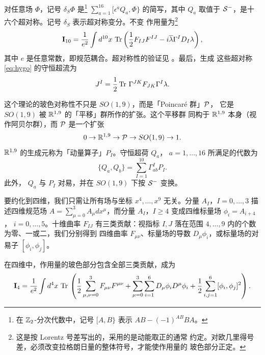  对任意场 $\Phi$，记号 $\delta_S \Phi$ 是\footnote{在
$\Bbb{Z}_2$-分次代数中，记号 $[A,B\}$ 表示 $AB-(-1)^{AB}BA$。}
$\sum_{a=1}^{16}[\epsilon^aQ_a,\Phi\}$ 的简写，其中 $Q_a$ 取值于
${\EUS}^-$，是十六个超对称。记号 $\delta_S$ 表示超对称变分。不变
作用量为\footnote{这是按 Lorentz 号差写出的，采用的是动能取正的通常
约定。对欧几里得号差，必须改变拉格朗日量的整体符号，才能使作用量的
玻色部分正定。} %
\setcounter{equation}{5}
\begin{equation}\label{eq:ygo}
{{\cmmib I}}_{10}={1\over e^2}\int
d^{10}x\,\Tr\left({1\over
2}F_{IJ}F^{IJ}-i\bar\lambda\Gamma^ID_I\lambda\right),
\end{equation}
 其中
$e$ 是任意常数，即规范耦合。超对称性的验证见 \cite{ref42}。最后，生成
这些超对称 \eqref{eq:hygo} 的守恒超流为
\setcounter{equation}{6}
\begin{equation}\label{eq:bygo}
J^I=\half\Tr\, \Gamma^{JK}F_{JK}\Gamma^I\lambda.
\end{equation}

 这个理论的玻色对称性不只是 $SO(1,9)$，而是「Poincaré 群」$\EUP$，
它是 $SO(1,9)$ 被 $\Bbb{R}^{1,9}$ 的「平移」群所作的扩张。这个平移群
同构于 $\Bbb{R}^{1,9}$ 本身（视作阿贝尔群），而 ${\EUP}$ 是一个扩张 %
\setcounter{equation}{7}
\begin{equation}\label{eq:ugy}
0\to
\Bbb{R}^{1,9}\to \EUP\to SO(1,9)\to 1.
\end{equation}
  $\Bbb{R}^{1,9}$ 的生成元称为「动量算子」$P_I$。守恒超荷 $Q_a$，
$a=1,\dots,16$ 所满足的代数为 %
\setcounter{equation}{8}
\begin{equation}\label{eq:realify}
\{Q_a,Q_b\}=\sum_{I=1}^{10}\Gamma^I_{ab}P_I.
\end{equation}
 此外，
$Q_a$ 与 $P_I$ 对易，并在 $SO(1,9)$ 下按 ${\EUS}^-$ 变换。

\par{}

 要约化到四维，我们只需让所有场与坐标 $x^4,\dots,x^9$ 无关。分量
$A_I$，$I=0,\dots,3$ 描述四维规范场
$A=\sum_{\mu=0}^3A_\mu dx^\mu$，而分量 $A_I$，$I\ge
4$ 变成四维标量场 $\phi_i=A_{i+4}$，
$i=0,\dots,5$。十维曲率 $F_{IJ}$ 有三类贡献：视指标
$I,J$ 落在范围 $4,\dots, 9$ 内的个数为零、一或二，我们分别得到
四维曲率 $F_{\mu\nu}$、标量场的导数
$D_\mu\phi_i$，或标量场的对易子 $[\phi_i,\phi_j]$。

 在四维中，作用量的玻色部分包含全部三类贡献，成为 %
\setcounter{equation}{9}
\begin{equation}\label{eq:loopy}
{{\cmmib
I}}_4={1\over e^2}\int d^4x\,\Tr\,\left({1\over
2}\sum_{\mu,\nu=0}^3F_{\mu\nu}F^{\mu\nu}+\sum_{\mu=0}^3\sum_{i=1}^6D_\mu\phi_i
D^\mu\phi_i +{1\over 2}\sum_{i,j=1}^6[\phi_i,\phi_j]^2\right).
\end{equation}

